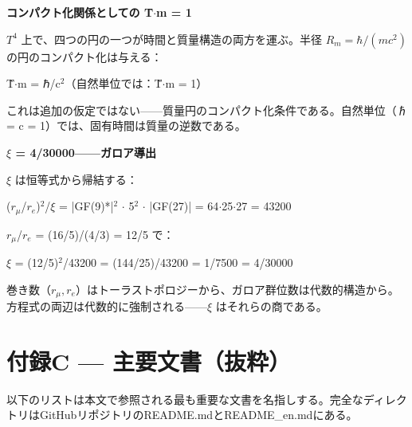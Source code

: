 \documentclass[11pt,openany]{book}
\begin{document}
\textbf{コンパクト化関係としての T̃$\cdot$m = 1}

$T^4$ 上で、四つの円の一つが時間と質量構造の両方を運ぶ。半径 $R_m = \hbar/(mc^2)$ の円のコンパクト化は与える：

T̃$\cdot$m = ℏ/c$^2$（自然単位では：T̃$\cdot$m = 1）

これは追加の仮定ではない——質量円のコンパクト化条件である。自然単位（ℏ = c = 1）では、固有時間は質量の逆数である。

\textbf{$\xi$ = 4/30000——ガロア導出}

$\xi$ は恒等式から帰結する：

($r_\mu$/$r_e$)$^2$/$\xi$ = |GF(9)*|$^2$ $\cdot$ 5$^2$ $\cdot$ |GF(27)| = 64$\cdot$25$\cdot$27 = 43200

$r_\mu$/$r_e$ = (16/5)/(4/3) = 12/5 で：

$\xi$ = (12/5)$^2$/43200 = (144/25)/43200 = 1/7500 = 4/30000

巻き数（$r_\mu, r_e$）はトーラストポロジーから、ガロア群位数は代数的構造から。方程式の両辺は代数的に強制される——$\xi$ はそれらの商である。

\medskip

\chapter*{付録C — 主要文書（抜粋）}

以下のリストは本文で参照される最も重要な文書を名指しする。完全なディレクトリはGitHubリポジトリのREADME.mdとREADME\_en.mdにある。
\end{document}
